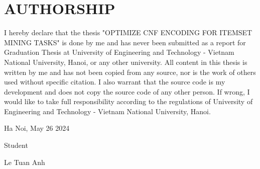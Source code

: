 \chapter*{AUTHORSHIP}
\fontsize{13}{15}\selectfont

I hereby declare that the thesis "OPTIMIZE CNF ENCODING FOR ITEMSET
MINING TASKS" is done by me and has never been submitted as a report for Graduation Thesis at University of Engineering and Technology - Vietnam National University, Hanoi, or any other university. All content in this thesis is written by me and has not been copied from any source, nor is the work of others used without specific citation.
I also warrant that the source code is my development and does not copy the source code of any other person.
If wrong, I would like to take full responsibility according to the regulations of University of Engineering and Technology - Vietnam National University, Hanoi.

\vspace{0.5cm}

\begin{flushright}
    Ha Noi, May 26 2024 \par
    Student\hspace*{0.8cm}\par
    \vspace{2.5cm}
    Le Tuan Anh\par
\end{flushright}